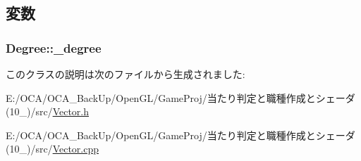 \subsection{変数}
\hypertarget{class_degree_afb0e7feba9785028e108a5156533fad7}{
\subsubsection[{\-\_\-degree}]{ Degree\-::\-\_\-degree}}\label{class_degree_afb0e7feba9785028e108a5156533fad7}


このクラスの説明は次のファイルから生成されました\-:\begin{DoxyCompactItemize}
\item 
E\-:/\-O\-C\-A/\-O\-C\-A\-\_\-\-Back\-Up/\-Open\-G\-L/\-Game\-Proj/当たり判定と職種作成とシェーダ(10\-\_)/src/\hyperlink{_vector_8h}{Vector.\-h}\item 
E\-:/\-O\-C\-A/\-O\-C\-A\-\_\-\-Back\-Up/\-Open\-G\-L/\-Game\-Proj/当たり判定と職種作成とシェーダ(10\-\_)/src/\hyperlink{_vector_8cpp}{Vector.\-cpp}\end{DoxyCompactItemize}
